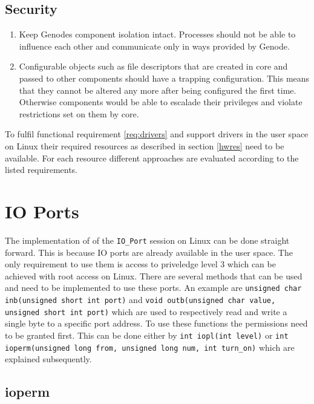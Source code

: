 \documentclass[
a4paper,
12pt,
notitlepage,
parskip=half,
DIV=11,
]{scrbook}
\begin{document}
		\subsection{Security}
		
		\begin{enumerate}
			\item \label{req:isolation} Keep Genodes component isolation intact.
			Processes should not be able to influence each other and communicate only in ways provided by Genode.
			\item \label{req:traps} Configurable objects such as file descriptors that are created in core and passed to other components should have a trapping configuration.
			This means that they cannot be altered any more after being configured the first time.
			Otherwise components would be able to escalade their privileges and violate restrictions set on them by core.
			
		\end{enumerate}
	
		To fulfil functional requirement \ref{req:drivers} and support drivers in the user space on Linux their required resources as described in section \ref{hwres} need to be available.
		For each resource different approaches are evaluated according to the listed requirements.
		
		\section{IO Ports}
		
		The implementation of of the \texttt{IO\_Port} session on Linux can be done straight forward.
		This is because IO ports are already available in the user space.
		The only requirement to use them is access to priveledge level 3 which can be achieved with root access on Linux.
		There are several methods that can be used and need to be implemented to use these ports.
		An example are \texttt{unsigned char inb(unsigned short int port)} and \texttt{void outb(unsigned char value, unsigned short int port)} which are used to respectively read and write a single byte to a specific port address.
		To use these functions the permissions need to be granted first.
		This can be done either by \texttt{int iopl(int level)} or \texttt{int ioperm(unsigned long from, unsigned long num, int turn\_on)} which are explained subsequently. \citep{outb} \citep{ioperm} \citep{iopl}
		
		\subsection{ioperm}
		
\end{document}
